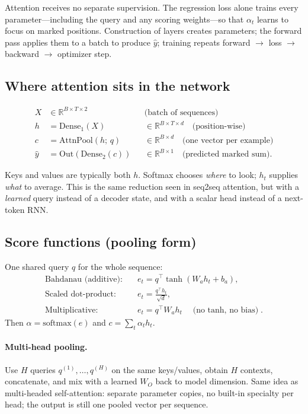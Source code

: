 \documentclass[11pt]{article}
\begin{document}
Attention receives no separate supervision. The regression loss alone
trains every parameter---including the query and any scoring weights---so
that \(\alpha_t\) learns to focus on marked positions. Construction of
layers creates parameters; the forward pass applies them to a batch to
produce \(\hat{y}\); training repeats forward \(\to\) loss \(\to\)
backward \(\to\) optimizer step.

\subsection{Where attention sits in the network}

\[
\begin{aligned}
X &\in \mathbb{R}^{B\times T\times 2}
  &&\text{(batch of sequences)} \\
h &= \mathrm{Dense}_1(X)
  &&\in \mathbb{R}^{B\times T\times d}
  \quad\text{(position-wise)} \\
c &= \mathrm{AttnPool}(h;\,q)
  &&\in \mathbb{R}^{B\times d}
  \quad\text{(one vector per example)} \\
\hat{y} &= \mathrm{Out}(\mathrm{Dense}_2(c))
  &&\in \mathbb{R}^{B\times 1}
  \quad\text{(predicted marked sum)}.
\end{aligned}
\]

Keys and values are typically both \(h\). Softmax chooses \emph{where} to
look; \(h_t\) supplies \emph{what} to average. This is the same reduction
seen in seq2seq attention, but with a \emph{learned} query instead of a
decoder state, and with a scalar head instead of a next-token RNN.

\subsection{Score functions (pooling form)}

One shared query \(q\) for the whole sequence:
\begin{align*}
\text{Bahdanau (additive):} &\quad
  e_t = q^\top \tanh(W_a h_t + b_a), \\
\text{Scaled dot-product:} &\quad
  e_t = \frac{q^\top h_t}{\sqrt{d}}, \\
\text{Multiplicative:} &\quad
  e_t = q^\top W_a h_t
  \quad\text{(no \(\tanh\), no bias)}.
\end{align*}
Then \(\alpha=\mathrm{softmax}(e)\) and \(c=\sum_t \alpha_t h_t\).

\paragraph{Multi-head pooling.}
Use \(H\) queries \(q^{(1)},\ldots,q^{(H)}\) on the same keys/values,
obtain \(H\) contexts, concatenate, and mix with a learned \(W_O\) back to
model dimension. Same idea as multi-headed self-attention: separate
parameter copies, no built-in specialty per head; the output is still one
pooled vector per sequence.
\end{document}

